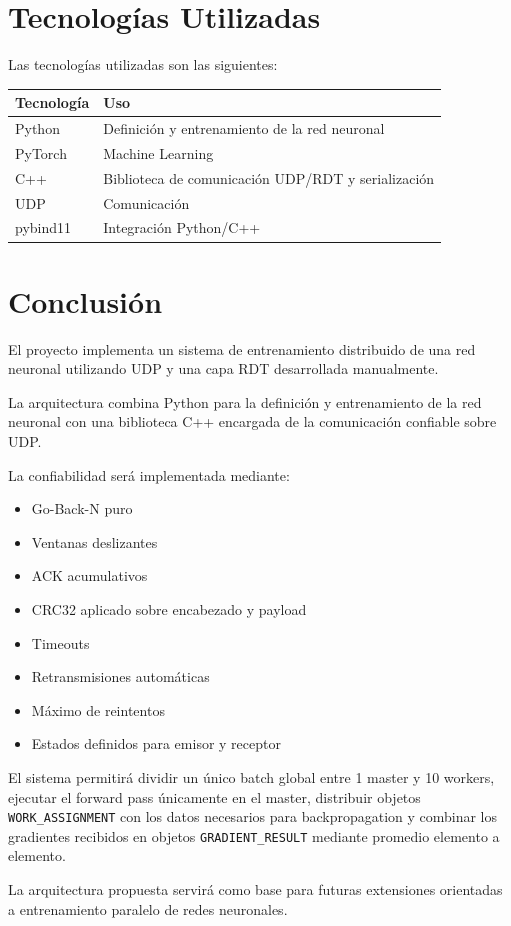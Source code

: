 \documentclass[12pt]{article}
\begin{document}
\section{Tecnologías Utilizadas}

Las tecnologías utilizadas son las siguientes:

\begin{table}[h]
\centering
\begin{tabular}{|l|l|}
\hline
Tecnología & Uso \\
\hline
Python & Definición y entrenamiento de la red neuronal \\
\hline
PyTorch & Machine Learning \\
\hline
C++ & Biblioteca de comunicación UDP/RDT y serialización \\
\hline
UDP & Comunicación \\
\hline
pybind11 & Integración Python/C++ \\
\hline
\end{tabular}
\end{table}

\section{Conclusión}

El proyecto implementa un sistema de entrenamiento distribuido de una red neuronal utilizando UDP y una capa RDT desarrollada manualmente.

La arquitectura combina Python para la definición y entrenamiento de la red neuronal con una biblioteca C++ encargada de la comunicación confiable sobre UDP.

La confiabilidad será implementada mediante:

\begin{itemize}
\item Go-Back-N puro
\item Ventanas deslizantes
\item ACK acumulativos
\item CRC32 aplicado sobre encabezado y payload
\item Timeouts
\item Retransmisiones automáticas
\item Máximo de reintentos
\item Estados definidos para emisor y receptor
\end{itemize}

El sistema permitirá dividir un único batch global entre 1 master y 10 workers, ejecutar el forward pass únicamente en el master, distribuir objetos \texttt{WORK\_ASSIGNMENT} con los datos necesarios para backpropagation y combinar los gradientes recibidos en objetos \texttt{GRADIENT\_RESULT} mediante promedio elemento a elemento.

La arquitectura propuesta servirá como base para futuras extensiones orientadas a entrenamiento paralelo de redes neuronales.
\end{document}
